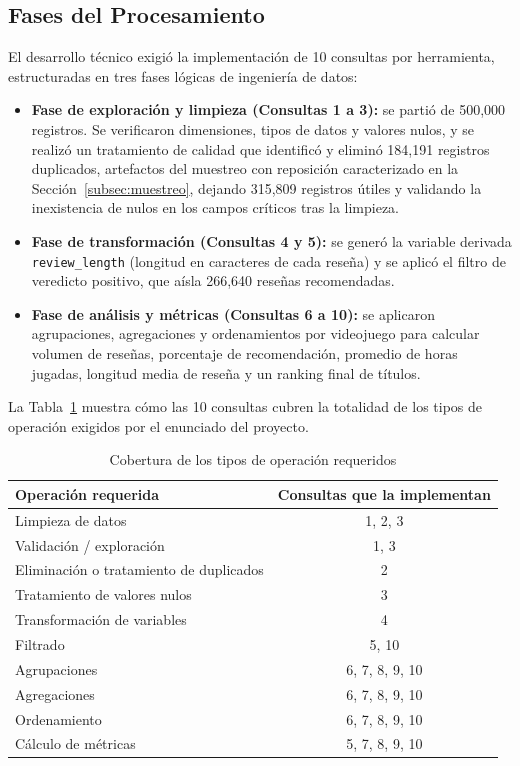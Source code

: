 \subsection{Fases del Procesamiento}
El desarrollo técnico exigió la implementación de 10 consultas por herramienta, estructuradas en tres fases lógicas de ingeniería de datos:

\begin{itemize}[leftmargin=*]
    \item \textbf{Fase de exploración y limpieza (Consultas 1 a 3):} se partió de 500,000 registros. Se verificaron dimensiones, tipos de datos y valores nulos, y se realizó un tratamiento de calidad que identificó y eliminó 184,191 registros duplicados, artefactos del muestreo con reposición caracterizado en la Sección~\ref{subsec:muestreo}, dejando 315,809 registros útiles y validando la inexistencia de nulos en los campos críticos tras la limpieza.
    \item \textbf{Fase de transformación (Consultas 4 y 5):} se generó la variable derivada \texttt{review\_length} (longitud en caracteres de cada reseña) y se aplicó el filtro de veredicto positivo, que aísla 266,640 reseñas recomendadas.
    \item \textbf{Fase de análisis y métricas (Consultas 6 a 10):} se aplicaron agrupaciones, agregaciones y ordenamientos por videojuego para calcular volumen de reseñas, porcentaje de recomendación, promedio de horas jugadas, longitud media de reseña y un ranking final de títulos.
\end{itemize}

La Tabla~\ref{tab:cobertura} muestra cómo las 10 consultas cubren la totalidad de los tipos de operación exigidos por el enunciado del proyecto.

\begin{table}[H]
\centering
\caption{Cobertura de los tipos de operación requeridos}
\label{tab:cobertura}
\vspace{0.2cm}
\small
\begin{tabular}{lc}
\toprule
\textbf{Operación requerida} & \textbf{Consultas que la implementan} \\
\midrule
Limpieza de datos                        & 1, 2, 3 \\
Validación / exploración                 & 1, 3 \\
Eliminación o tratamiento de duplicados  & 2 \\
Tratamiento de valores nulos             & 3 \\
Transformación de variables              & 4 \\
Filtrado                                 & 5, 10 \\
Agrupaciones                             & 6, 7, 8, 9, 10 \\
Agregaciones                             & 6, 7, 8, 9, 10 \\
Ordenamiento                             & 6, 7, 8, 9, 10 \\
Cálculo de métricas                      & 5, 7, 8, 9, 10 \\
\bottomrule
\end{tabular}
\end{table}
